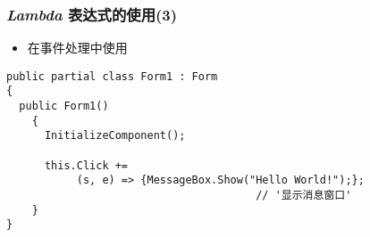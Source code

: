\begin{frame}[fragile]
\frametitle{\textit{Lambda} 表达式的使用(3)}
\begin{itemize}
\item 在事件处理中使用
\end{itemize}
\begin{lstlisting}[escapeinside='']
public partial class Form1 : Form
{
  public Form1()
    {
      InitializeComponent();

      this.Click +=
           (s, e) => {MessageBox.Show("Hello World!");};
                                       // '显示消息窗口'
    }
}
\end{lstlisting}
\end{frame}



